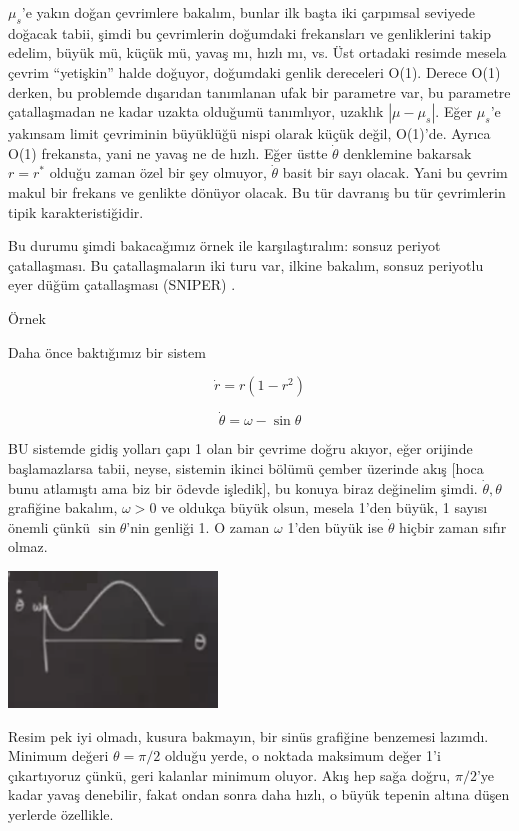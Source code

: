 \documentclass[12pt,fleqn]{article}\usepackage{../../common}
\begin{document}
$\mu_s$'e yakın doğan çevrimlere bakalım, bunlar ilk başta iki çarpımsal
seviyede doğacak tabii, şimdi bu çevrimlerin doğumdaki frekansları ve
genliklerini takip edelim, büyük mü, küçük mü, yavaş mı, hızlı mı, vs. Üst
ortadaki resimde mesela çevrim ``yetişkin'' halde doğuyor, doğumdaki genlik
dereceleri O(1). Derece O(1) derken, bu problemde dışarıdan tanımlanan ufak
bir parametre var, bu parametre çatallaşmadan ne kadar uzakta olduğumü
tanımlıyor, uzaklık $|\mu - \mu_s|$. Eğer $\mu_s$'e yakınsam limit
çevriminin büyüklüğü nispi olarak küçük değil, O(1)'de. Ayrıca O(1)
frekansta, yani ne yavaş ne de hızlı. Eğer üstte $\dot{\theta}$ denklemine
bakarsak $r = r^*$ olduğu zaman özel bir şey olmuyor, $\dot{\theta}$ basit
bir sayı olacak. Yani bu çevrim makul bir frekans ve genlikte dönüyor
olacak. Bu tür davranış bu tür çevrimlerin tipik karakteristiğidir.

Bu durumu şimdi bakacağımız örnek ile karşılaştıralım: sonsuz periyot
çatallaşması. Bu çatallaşmaların iki turu var, ilkine bakalım, sonsuz
periyotlu eyer düğüm çatallaşması (SNIPER) . 

Örnek

Daha önce baktığımız bir sistem

$$ \dot{r} = r (1-r^2) $$

$$ \dot{\theta} = \omega - \sin\theta $$

BU sistemde gidiş yolları çapı 1 olan bir çevrime doğru akıyor, eğer
orijinde başlamazlarsa tabii, neyse, sistemin ikinci bölümü çember üzerinde
akış [hoca bunu atlamıştı ama biz bir ödevde işledik], bu konuya biraz
değinelim şimdi. $\dot{\theta},\theta$ grafiğine bakalım, $\omega > 0$ ve
oldukça büyük olsun, mesela 1'den büyük, 1 sayısı önemli çünkü
$\sin\theta$'nin genliği 1. O zaman $\omega$ 1'den büyük ise $\dot{\theta}$
hiçbir zaman sıfır olmaz. 

\includegraphics[width=15em]{14_07.png}

Resim pek iyi olmadı, kusura bakmayın, bir sinüs grafiğine benzemesi
lazımdı. Minimum değeri $\theta=\pi/2$ olduğu yerde, o noktada maksimum
değer 1'i çıkartıyoruz çünkü, geri kalanlar minimum oluyor. Akış hep sağa
doğru, $\pi/2$'ye kadar yavaş denebilir, fakat ondan sonra daha hızlı, o
büyük tepenin altına düşen yerlerde özellikle.
\end{document}
